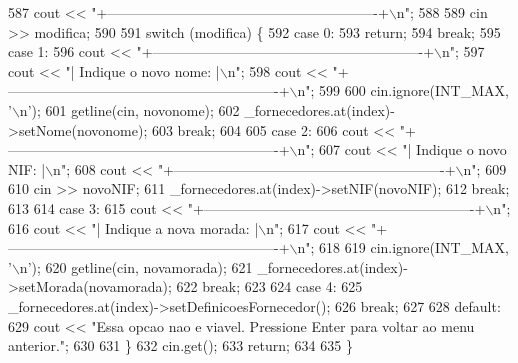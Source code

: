 \begin{DoxyCode}
587     cout << \textcolor{stringliteral}{"+----------------------------------------------------------+\(\backslash\)n"};
588 
589     cin >> modifica;
590     
591     \textcolor{keywordflow}{switch} (modifica) \{
592     \textcolor{keywordflow}{case} 0:
593         \textcolor{keywordflow}{return};
594         \textcolor{keywordflow}{break};
595     \textcolor{keywordflow}{case} 1:
596         cout << \textcolor{stringliteral}{"+----------------------------------------------------------+\(\backslash\)n"};
597         cout << \textcolor{stringliteral}{"| Indique o novo nome:                                     |\(\backslash\)n"};
598         cout << \textcolor{stringliteral}{"+----------------------------------------------------------+\(\backslash\)n"};
599 
600         cin.ignore(INT\_MAX, \textcolor{charliteral}{'\(\backslash\)n'});
601         getline(cin, novonome);
602         \_fornecedores.at(index)->setNome(novonome);
603         \textcolor{keywordflow}{break};
604 
605     \textcolor{keywordflow}{case} 2:
606         cout << \textcolor{stringliteral}{"+----------------------------------------------------------+\(\backslash\)n"};
607         cout << \textcolor{stringliteral}{"| Indique o novo NIF:                                      |\(\backslash\)n"};
608         cout << \textcolor{stringliteral}{"+----------------------------------------------------------+\(\backslash\)n"};
609 
610         cin >> novoNIF;
611         \_fornecedores.at(index)->setNIF(novoNIF);
612         \textcolor{keywordflow}{break};
613 
614     \textcolor{keywordflow}{case} 3:
615         cout << \textcolor{stringliteral}{"+----------------------------------------------------------+\(\backslash\)n"};
616         cout << \textcolor{stringliteral}{"| Indique a nova morada:                                   |\(\backslash\)n"};
617         cout << \textcolor{stringliteral}{"+----------------------------------------------------------+\(\backslash\)n"};
618 
619         cin.ignore(INT\_MAX, \textcolor{charliteral}{'\(\backslash\)n'});
620         getline(cin, novamorada);
621         \_fornecedores.at(index)->setMorada(novamorada);
622         \textcolor{keywordflow}{break};
623     
624     \textcolor{keywordflow}{case} 4:
625         \_fornecedores.at(index)->setDefinicoesFornecedor();
626         \textcolor{keywordflow}{break};
627 
628     \textcolor{keywordflow}{default}:
629         cout << \textcolor{stringliteral}{"Essa opcao nao e viavel. Pressione Enter para voltar ao menu anterior."};
630 
631     \}
632     cin.get();
633     \textcolor{keywordflow}{return};
634 
635 \}
\end{DoxyCode}


